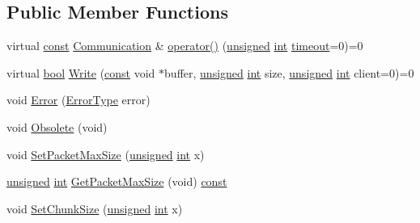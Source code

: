 \subsection*{Public Member Functions}
\begin{DoxyCompactItemize}
\item 
virtual \hyperlink{term__entry_8h_a57bd63ce7f9a353488880e3de6692d5a}{const} \hyperlink{namespacebpt_1_1_net_com_af30d27373a967c6e6bcbf97963e2ab1d}{Communication} \& \hyperlink{classbpt_1_1_net_com_1_1_communicator_ab7e2be99f24a3250c99b0c4230b73323}{operator()} (\hyperlink{curses_8priv_8h_aca40206900cfc164654362fa8d4ad1e6}{unsigned} \hyperlink{term__entry_8h_ad65b480f8c8270356b45a9890f6499ae}{int} \hyperlink{_ndk_8cpp_a174cf046f3b5dbb1258515b3f138b8c7}{timeout}=0)=0
\item 
virtual \hyperlink{term__entry_8h_a002004ba5d663f149f6c38064926abac}{bool} \hyperlink{classbpt_1_1_net_com_1_1_communicator_a4c405127bb3b4ce96506a4750568d075}{Write} (\hyperlink{term__entry_8h_a57bd63ce7f9a353488880e3de6692d5a}{const} void $\ast$buffer, \hyperlink{curses_8priv_8h_aca40206900cfc164654362fa8d4ad1e6}{unsigned} \hyperlink{term__entry_8h_ad65b480f8c8270356b45a9890f6499ae}{int} size, \hyperlink{curses_8priv_8h_aca40206900cfc164654362fa8d4ad1e6}{unsigned} \hyperlink{term__entry_8h_ad65b480f8c8270356b45a9890f6499ae}{int} client=0)=0
\item 
void \hyperlink{classbpt_1_1_net_com_1_1_communicator_a94858c4f50340b5b2ea3dc1d2c509c28}{Error} (\hyperlink{namespacebpt_1_1_net_com_a401866ee6997493e98c7823af2d1bca6}{Error\-Type} error)
\item 
void \hyperlink{classbpt_1_1_net_com_1_1_communicator_acdbdb95437aa3770654de3f738ba82ee}{Obsolete} (void)
\item 
void \hyperlink{classbpt_1_1_net_com_1_1_communicator_a0770c588f1cd912358182c5a12e58e50}{Set\-Packet\-Max\-Size} (\hyperlink{curses_8priv_8h_aca40206900cfc164654362fa8d4ad1e6}{unsigned} \hyperlink{term__entry_8h_ad65b480f8c8270356b45a9890f6499ae}{int} x)
\item 
\hyperlink{curses_8priv_8h_aca40206900cfc164654362fa8d4ad1e6}{unsigned} \hyperlink{term__entry_8h_ad65b480f8c8270356b45a9890f6499ae}{int} \hyperlink{classbpt_1_1_net_com_1_1_communicator_a9f866845cf57d9dde8c43755eca21709}{Get\-Packet\-Max\-Size} (void) \hyperlink{term__entry_8h_a57bd63ce7f9a353488880e3de6692d5a}{const} 
\item 
void \hyperlink{classbpt_1_1_net_com_1_1_communicator_a615e1f9a9067d83f835de49e7814d01d}{Set\-Chunk\-Size} (\hyperlink{curses_8priv_8h_aca40206900cfc164654362fa8d4ad1e6}{unsigned} \hyperlink{term__entry_8h_ad65b480f8c8270356b45a9890f6499ae}{int} x)

\end{DoxyCompactItemize}

